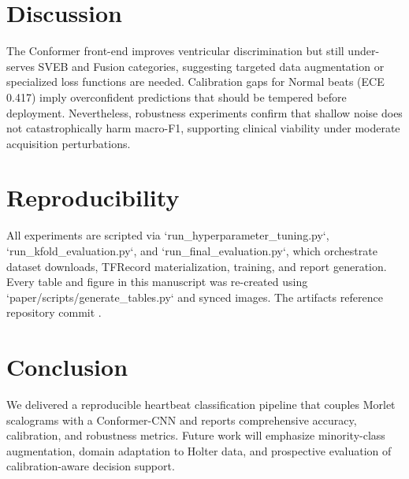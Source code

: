 \documentclass[preprint,3p]{elsarticle}
\begin{document}
\section{Discussion}
\label{sec:discussion}
The Conformer front-end improves ventricular discrimination but still under-serves SVEB and Fusion categories, suggesting targeted data augmentation or specialized loss functions are needed. Calibration gaps for Normal beats (ECE 0.417) imply overconfident predictions that should be tempered before deployment. Nevertheless, robustness experiments confirm that shallow noise does not catastrophically harm macro-F1, supporting clinical viability under moderate acquisition perturbations.

\section{Reproducibility}
All experiments are scripted via `run_hyperparameter_tuning.py`, `run_kfold_evaluation.py`, and `run_final_evaluation.py`, which orchestrate dataset downloads, TFRecord materialization, training, and report generation. Every table and figure in this manuscript was re-created using `paper/scripts/generate_tables.py` and synced images. The artifacts reference repository commit .

\section{Conclusion}
\label{sec:conclusion}
We delivered a reproducible heartbeat classification pipeline that couples Morlet scalograms with a Conformer-CNN and reports comprehensive accuracy, calibration, and robustness metrics. Future work will emphasize minority-class augmentation, domain adaptation to Holter data, and prospective evaluation of calibration-aware decision support.


\end{document}
